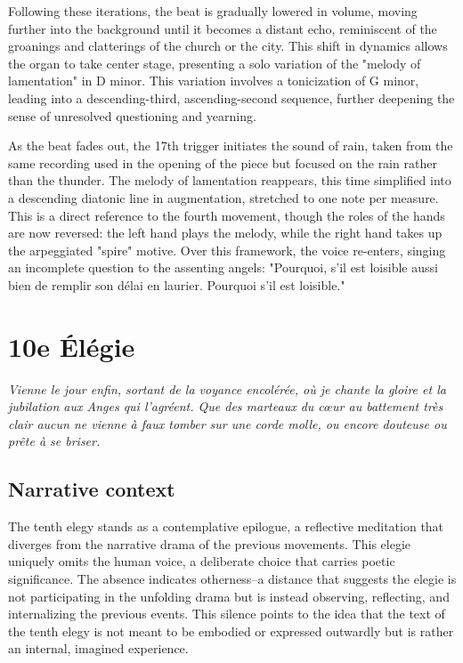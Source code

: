 \documentclass[12pt,twoside,maitrise]{dms_ks}
\theoremstyle{definition}
\begin{document}
Following these iterations, the beat is gradually lowered in volume, moving further into the background until it becomes a distant echo, reminiscent of the groanings and clatterings of the church or the city. 
This shift in dynamics allows the organ to take center stage, presenting a solo variation of the "melody of lamentation" in D minor. 
This variation involves a tonicization of G minor, leading into a descending-third, ascending-second sequence, further deepening the sense of unresolved questioning and yearning.


As the beat fades out, the 17th trigger initiates the sound of rain, taken from the same recording used in the opening of the piece but focused on the rain rather than the thunder. 
The melody of lamentation reappears, this time simplified into a descending diatonic line in augmentation, stretched to one note per measure. 
This is a direct reference to the fourth movement, though the roles of the hands are now reversed: the left hand plays the melody, while the right hand takes up the arpeggiated "spire" motive. 
Over this framework, the voice re-enters, singing an incomplete question to the assenting angels: "Pourquoi, s'il est loisible aussi bien de remplir son délai en laurier. 
Pourquoi s'il est loisible."


\section{10e Élégie}

\epigraph{\textit{Vienne le jour enfin, sortant de la voyance encolérée, où je chante la gloire et la jubilation aux Anges qui l’agréent. Que des marteaux du cœur au battement très clair aucun ne vienne à faux tomber sur une corde molle, ou encore douteuse ou prête à se briser.}}{}

\subsection{Narrative context}

The tenth elegy stands as a contemplative epilogue, a reflective meditation that diverges from the narrative drama of the previous movements. 
This elegie uniquely omits the human voice, a deliberate choice that carries poetic significance. 
The absence indicates otherness--a distance that suggests the elegie is not participating in the unfolding drama but is instead observing, reflecting, and internalizing the previous events. 
This silence points to the idea that the text of the tenth elegy is not meant to be embodied or expressed outwardly but is rather an internal, imagined experience.
\end{document}
